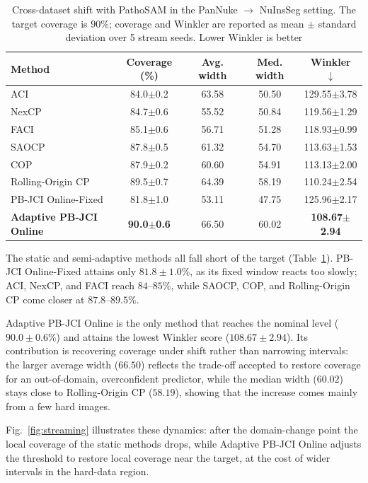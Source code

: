 \documentclass[smallextended,natbib]{svjour3}
\begin{document}
\begin{table}[!ht]
\caption{Cross-dataset shift with PathoSAM in the PanNuke $\to$ NuInsSeg setting.
The target coverage is $90\%$; coverage and Winkler are reported as mean $\pm$
standard deviation over 5 stream seeds. Lower Winkler is better}
\label{tab:cross}
\centering
\begin{tabular}{@{}lcccc@{}}
\toprule
Method & Coverage (\%) & Avg. width & Med. width & Winkler $\downarrow$ \\
\midrule
ACI
& 84.0$\pm$0.2 & 63.58 & 50.50 & 129.55$\pm$3.78 \\
NexCP
& 84.7$\pm$0.6 & 55.52 & 50.84 & 119.56$\pm$1.29 \\
FACI
& 85.1$\pm$0.6 & 56.71 & 51.28 & 118.93$\pm$0.99 \\
SAOCP
& 87.8$\pm$0.5 & 61.32 & 54.70 & 113.63$\pm$1.53 \\
COP
& 87.9$\pm$0.2 & 60.60 & 54.91 & 113.13$\pm$2.00 \\
Rolling-Origin CP
& 89.5$\pm$0.7 & 64.39 & 58.19 & 110.24$\pm$2.54 \\
PB-JCI Online-Fixed
& 81.8$\pm$1.0 & 53.11 & 47.75 & 125.96$\pm$2.17 \\
\textbf{Adaptive PB-JCI Online}
& \textbf{90.0$\pm$0.6} & 66.50 & 60.02 & \textbf{108.67$\pm$2.94} \\
\bottomrule
\end{tabular}
\end{table}

The static and semi-adaptive methods all fall short of the target
(Table~\ref{tab:cross}). PB-JCI Online-Fixed attains only $81.8\pm1.0\%$, as its
fixed window reacts too slowly; ACI, NexCP, and FACI reach $84$--$85\%$, while SAOCP,
COP, and Rolling-Origin CP come closer at $87.8$--$89.5\%$.

Adaptive PB-JCI Online is the only method that reaches the nominal level
($90.0\pm0.6\%$) and attains the lowest Winkler score ($108.67\pm2.94$). Its
contribution is recovering coverage under shift rather than narrowing intervals:
the larger average width ($66.50$) reflects the trade-off accepted to restore
coverage for an out-of-domain, overconfident predictor, while the median width
($60.02$) stays close to Rolling-Origin CP ($58.19$), showing that the increase
comes mainly from a few hard images.

Fig.~\ref{fig:streaming} illustrates these dynamics: after the domain-change point
the local coverage of the static methods drops, while Adaptive PB-JCI Online adjusts
the threshold to restore local coverage near the target, at the cost of wider
intervals in the hard-data region.
\end{document}
